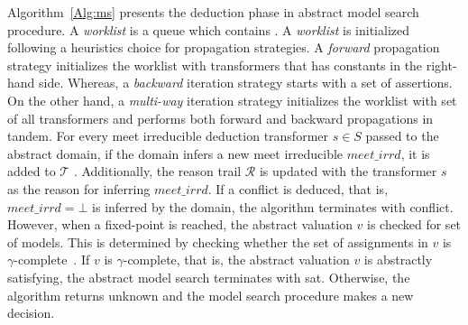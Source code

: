 Algorithm~\ref{Alg:ms} presents the deduction phase in abstract model
search procedure. 
A {\em worklist} is a queue which contains .  A {\em worklist} is initialized following a heuristics 
choice for propagation strategies. A {\em forward} propagation strategy 
initializes the worklist with  transformers that 
has constants in the right-hand side. Whereas, a {\em backward} 
iteration strategy starts with a set of assertions. On the other hand, a 
{\em multi-way} iteration strategy initializes the worklist with set of all 
transformers and performs both forward and backward propagations in tandem.  
For every meet irreducible deduction transformer  $s \in S$ 
passed to the abstract domain, if the domain infers a new meet irreducible 
$\mathit{meet\_irrd}$, it is added to $\mathcal{T}$ .  Additionally, the reason 
trail $\mathcal{R}$  is updated with the transformer $s$ as the reason for inferring
$\mathit{meet\_irrd}$. If a conflict is deduced, that is, $\mathit{meet\_irrd} = \bot$ 
is inferred by the domain, the algorithm terminates with \textsf{conflict}.  However,
when a fixed-point is reached, the abstract valuation $v$ is checked for set of
models.  This is determined by checking whether the set of assignments in $v$ is 
$\gamma$-complete~\cite{dhk2013-popl}. If $v$ is $\gamma$-complete, that is, the 
abstract valuation $v$ is abstractly satisfying, the abstract model 
search terminates with \textsf{sat}.  Otherwise, the algorithm returns \textsf{unknown} and the 
model search procedure makes a new decision.    



